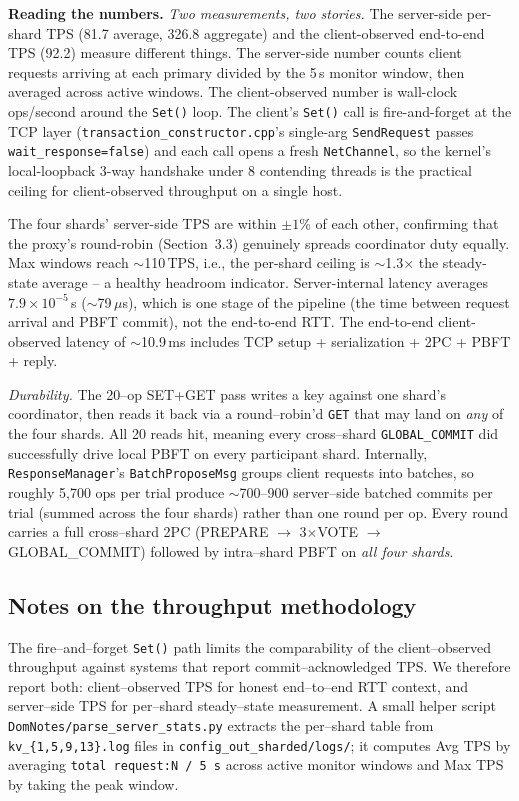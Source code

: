 \documentclass[11pt]{article}
\begin{document}
\medskip
\noindent\textbf{Reading the numbers.}
\textit{Two measurements, two stories.} The server-side per-shard TPS
(81.7 average, 326.8 aggregate) and the client-observed end-to-end
TPS (92.2) measure different things. The server-side number counts
client requests arriving at each primary divided by the 5\,s monitor
window, then averaged across active windows. The client-observed
number is wall-clock ops/second around the \texttt{Set()} loop.
The client's \texttt{Set()} call is fire-and-forget at the TCP layer
(\texttt{transaction\_constructor.cpp}'s single-arg
\texttt{SendRequest} passes \texttt{wait\_response=false}) and each
call opens a fresh \texttt{NetChannel}, so the kernel's local-loopback
3-way handshake under 8 contending threads is the practical ceiling
for client-observed throughput on a single host.

The four shards' server-side TPS are within $\pm 1$\% of each other,
confirming that the proxy's round-robin (Section~3.3) genuinely
spreads coordinator duty equally. Max windows reach $\sim$110\,TPS,
i.e., the per-shard ceiling is $\sim$1.3$\times$ the steady-state
average -- a healthy headroom indicator. Server-internal latency
averages $7.9 \times 10^{-5}$\,s ($\sim$79\,$\mu$s), which is one
stage of the pipeline (the time between request arrival and PBFT
commit), not the end-to-end RTT. The end-to-end client-observed
latency of $\sim$10.9\,ms includes TCP setup + serialization +
2PC + PBFT + reply.

\textit{Durability.} The 20--op SET+GET pass writes a key against one
shard's coordinator, then reads it back via a round--robin'd \texttt{GET}
that may land on \emph{any} of the four shards. All 20 reads hit,
meaning every cross--shard \texttt{GLOBAL\_COMMIT} did successfully
drive local PBFT on every participant shard. Internally,
\texttt{ResponseManager}'s \texttt{BatchProposeMsg} groups client
requests into batches, so roughly 5,700 ops per trial produce
$\sim$700--900 server--side batched commits per trial (summed across
the four shards) rather than one round per op. Every round carries
a full cross--shard 2PC (PREPARE $\rightarrow$ 3$\times$VOTE
$\rightarrow$ GLOBAL\_COMMIT) followed by intra--shard PBFT on
\emph{all four shards}.

\subsection{Notes on the throughput methodology}

The fire--and--forget \texttt{Set()} path limits the comparability of
the client--observed throughput against systems that report
commit--acknowledged TPS. We therefore report both: client--observed
TPS for honest end--to--end RTT context, and server--side TPS for
per--shard steady--state measurement. A small helper script
\texttt{DomNotes/parse\_server\_stats.py} extracts the per--shard
table from \texttt{kv\_\{1,5,9,13\}.log} files in
\texttt{config\_out\_sharded/logs/}; it computes Avg TPS by averaging
\texttt{total request:N / 5\,s} across active monitor windows and Max
TPS by taking the peak window.
\end{document}
